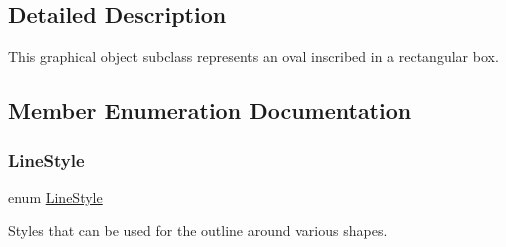 \subsection{Detailed Description}
This graphical object subclass represents an oval inscribed in a rectangular box. 

\subsection{Member Enumeration Documentation}
\mbox{\label{classsgl_1_1GObject_a86e0f5648542856159bb40775c854aa7}} 
\subsubsection{\texorpdfstring{Line\+Style}{LineStyle}}
{\footnotesize\ttfamily enum \mbox{\hyperlink{classsgl_1_1GObject_a86e0f5648542856159bb40775c854aa7}{Line\+Style}}\hspace{0.3cm}{\ttfamily [inherited]}}



Styles that can be used for the outline around various shapes. 

